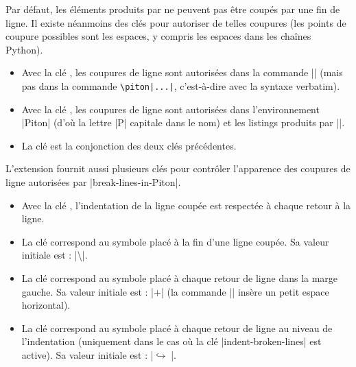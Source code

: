 \documentclass[dvipsnames,svgnames]{article}
\begin{document}
Par défaut, les éléments produits par  ne peuvent pas être coupés par une fin de ligne. Il existe
néanmoins des clés pour autoriser de telles coupures (les points de coupure possibles sont les espaces, y compris
les espaces dans les chaînes Python).
\begin{itemize}
\item {} Avec la clé , les coupures de ligne sont autorisées dans la commande
|| (mais pas dans la commande \verb+\piton|...|+, c'est-à-dire avec la syntaxe verbatim). 

\item {} Avec la clé , les coupures de ligne sont autorisées dans l'environnement
|{Piton}| (d'où la lettre |P| capitale dans le nom) et les listings produits par |\PitonInputFile|.

\item {} La clé  est la conjonction des deux clés précédentes.
\end{itemize}

\medskip
L'extension  fournit aussi plusieurs clés pour contrôler l'apparence des coupures de ligne autorisées par |break-lines-in-Piton|.

\begin{itemize}
\item {} Avec la clé , l'indentation de la ligne coupée est respectée à chaque retour
à la ligne. 

\item {} La clé  correspond au symbole placé à la fin d'une ligne coupée. Sa valeur initiale est : 
|\hspace*{0.5em}\textbackslash|.

\item {} La clé  correspond au symbole placé à chaque retour de ligne dans la marge
gauche. Sa valeur initiale est : |+\;| (la commande |\;| insère un petit espace horizontal). 

\item {} La clé  correspond au symbole placé à chaque retour de ligne
au niveau de l'indentation (uniquement dans le cas où la clé |indent-broken-lines| est active). Sa valeur initiale
est : |$\hookrightarrow\;$|.
\end{itemize}
\end{document}
